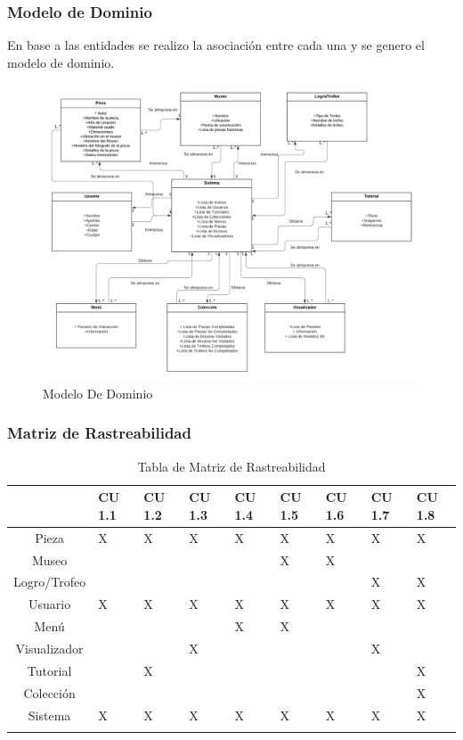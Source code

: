 \subsubsection{Modelo de Dominio}
En base a las entidades se realizo la asociación entre cada una y se genero el modelo de dominio.

\begin{figure}[H]
\centerline{\includegraphics[width=15cm]{imgs/ModeloDeDominio.png}}
\caption{Modelo De Dominio}
\label{ModeloDom}
\end{figure}

\subsubsection{Matriz de Rastreabilidad}
\begin{longtable}{|c|p{1.3cm}|p{1.3cm}|p{1.3cm}|p{1.3cm}|p{1.3cm}|p{1.3cm}|p{1.3cm}|p{1.3cm}|}
\hline 
 & CU 1.1 & CU 1.2 & CU 1.3 & CU 1.4 & CU 1.5 & CU 1.6 & CU 1.7 & CU 1.8\\ 
\hline 
Pieza & X & X & X & X & X & X & X & X \\ 
\hline 
Museo &   &   &   &   & X & X &   &   \\ 
\hline
Logro/Trofeo &   &   &   &   &   &   & X & X \\ 
\hline
Usuario & X & X & X & X & X & X & X & X \\ 
\hline
Menú &   &   &   & X & X &   &   & \\ 
\hline
Visualizador &   &   & X &  &  	 &   & X & \\ 
\hline
Tutorial  &   & X &   &   &   &   &   & X \\ 
\hline
Colección &  &   &   &   &   &   &   & X \\ 
\hline
Sistema & X & X & X & X & X & X & X & X \\ 
\hline
\caption{Tabla de Matriz de Rastreabilidad}
\label{tab29}\\
\end{longtable}